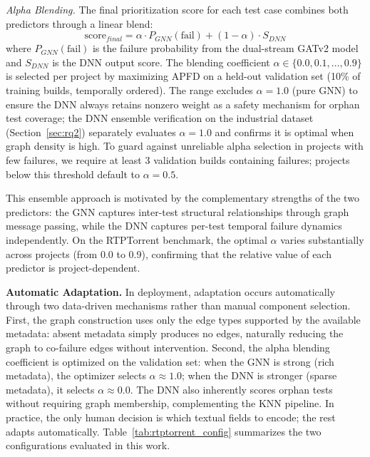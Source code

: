 \documentclass[10pt,journal,compsoc]{IEEEtran}
\begin{document}
\emph{Alpha Blending.}
The final prioritization score for each test case combines both predictors
through a linear blend:
\begin{equation}
    \text{score}_{final} = \alpha \cdot P_{GNN}(\text{fail}) +
    (1 - \alpha) \cdot S_{DNN}
\end{equation}
where $P_{GNN}(\text{fail})$ is the failure probability from the
dual-stream GATv2 model and $S_{DNN}$ is the DNN output score. The
blending coefficient $\alpha \in \{0.0, 0.1, \ldots, 0.9\}$ is selected
per project by maximizing APFD on a held-out validation set (10\% of
training builds, temporally ordered). The range excludes $\alpha = 1.0$
(pure GNN) to ensure the DNN always retains nonzero weight as a safety
mechanism for orphan test coverage; the DNN ensemble verification on the
industrial dataset (Section~\ref{sec:rq2}) separately evaluates
$\alpha = 1.0$ and confirms it is optimal when graph density is high.
To guard against unreliable alpha selection in projects with few failures,
we require at least 3 validation builds containing failures; projects
below this threshold default to $\alpha = 0.5$.

This ensemble approach is motivated by the complementary strengths of
the two predictors: the GNN captures inter-test structural relationships
through graph message passing, while the DNN captures per-test temporal
failure dynamics independently. On the RTPTorrent benchmark, the optimal
$\alpha$ varies substantially across projects (from 0.0 to 0.9),
confirming that the relative value of each predictor is
project-dependent.

\textbf{Automatic Adaptation.}
In deployment, adaptation occurs automatically through two data-driven
mechanisms rather than manual component selection. First, the graph
construction uses only the edge types supported
by the available metadata: absent metadata simply produces no edges,
naturally reducing the graph to co-failure edges without intervention.
Second, the alpha blending coefficient is optimized on the validation set:
when the GNN is strong (rich metadata), the optimizer selects
$\alpha \approx 1.0$; when the DNN is stronger (sparse metadata), it
selects $\alpha \approx 0.0$. The DNN also inherently scores orphan tests
without requiring graph membership, complementing the KNN pipeline. In
practice, the only human decision is which textual fields to encode; the
rest adapts automatically. Table~\ref{tab:rtptorrent_config} summarizes
the two configurations evaluated in this work.

\end{document}
